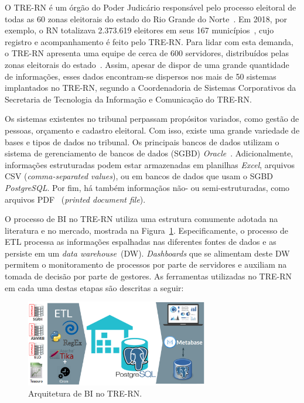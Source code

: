 O TRE-RN é um órgão do Poder Judicário responsável pelo processo  eleitoral de todas as 60 zonas eleitorais do estado do Rio Grande do Norte~\cite{zonas}. Em 2018, por exemplo, o RN totalizava 2.373.619 eleitores em seus 167 municípios~\cite{eleitorado}, cujo registro e acompanhamento é feito pelo TRE-RN. Para lidar com esta demanda, o TRE-RN apresenta uma equipe de cerca de 600 servidores, distribuídos pelas zonas eleitorais do estado~\cite{servidores}. Assim, apesar de dispor de uma grande quantidade de informações, esses dados encontram-se dispersos nos mais de 50 sistemas implantados no TRE-RN, segundo a Coordenadoria de Sistemas Corporativos da Secretaria de Tecnologia da Informação e Comunicação do TRE-RN.

Os sistemas existentes no tribunal perpassam propósitos variados, como gestão de pessoas, orçamento e cadastro eleitoral. Com isso, existe uma grande variedade de bases e tipos de dados no tribunal. Os principais bancos de dados utilizam o sistema de gerenciamento de bancos de dados (SGBD) \textit{Oracle}~\cite{}. Adicionalmente, informações estruturadas podem estar armazenadas em planilhas \textit{Excel}, arquivos CSV (\textit{comma-separated values}), ou em bancos de dados que usam o SGBD \textit{PostgreSQL}. Por fim, há também informaçãos não- ou semi-estruturadas, como arquivos PDF ~(\textit{printed document file}). 

O processo de BI no TRE-RN utiliza uma estrutura comumente adotada na literatura e no mercado, mostrada na Figura~\ref{fig:galaxy}. Especificamente, o processo de ETL processa as informações espalhadas nas diferentes fontes de dados e as persiste em um \textit{data warehouse}~(DW). \textit{Dashboards} que se alimentam deste DW permitem o monitoramento de processos por parte de servidores e auxiliam na tomada de decisão por parte de gestores. As ferramentas utilizadas no TRE-RN em cada uma destas etapas são descritas a seguir:

\begin{figure}[htp]
    \centering
    \includegraphics[width=8cm]{Imagens/Arq_TRE}
    \caption{Arquitetura de BI no TRE-RN.}
    \label{fig:galaxy}
\end{figure}

